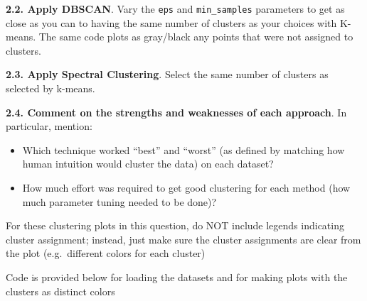 \documentclass[
  letterpaper,
  DIV=11,
  numbers=noendperiod]{scrartcl}
\providecommand{\tightlist}{%
  \setlength{\itemsep}{0pt}\setlength{\parskip}{0pt}}\usepackage{longtable,booktabs,array}
\begin{document}
\textbf{2.2. Apply DBSCAN}. Vary the \texttt{eps} and
\texttt{min\_samples} parameters to get as close as you can to having
the same number of clusters as your choices with K-means. The same code
plots as gray/black any points that were not assigned to clusters.

\textbf{2.3. Apply Spectral Clustering}. Select the same number of
clusters as selected by k-means.

\textbf{2.4. Comment on the strengths and weaknesses of each approach}.
In particular, mention:

\begin{itemize}
\tightlist
\item
  Which technique worked ``best'' and ``worst'' (as defined by matching
  how human intuition would cluster the data) on each dataset?
\item
  How much effort was required to get good clustering for each method
  (how much parameter tuning needed to be done)?
\end{itemize}

\begin{tcolorbox}[enhanced jigsaw, opacityback=0, leftrule=.75mm, left=2mm, opacitybacktitle=0.6, coltitle=black, colback=white, colbacktitle=quarto-callout-note-color!10!white, colframe=quarto-callout-note-color-frame, toptitle=1mm, toprule=.15mm, rightrule=.15mm, bottomtitle=1mm, breakable, titlerule=0mm, title=\textcolor{quarto-callout-note-color}{\faInfo}\hspace{0.5em}{Important note}, arc=.35mm, bottomrule=.15mm]

For these clustering plots in this question, do NOT include legends
indicating cluster assignment; instead, just make sure the cluster
assignments are clear from the plot (e.g.~different colors for each
cluster)

\end{tcolorbox}

Code is provided below for loading the datasets and for making plots
with the clusters as distinct colors
\end{document}

